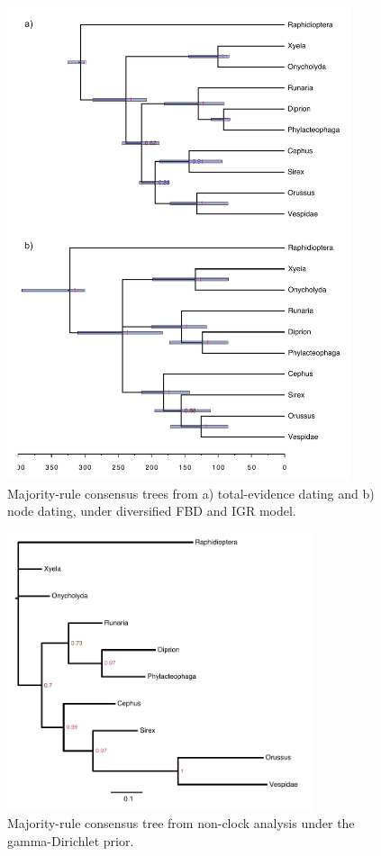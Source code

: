 \documentclass[12pt]{article}
\begin{document}
\begin{figure}[p]
\includegraphics[width=0.9\textwidth]{figures/cltree.pdf}
\caption{Majority-rule consensus trees from a) total-evidence dating and b) node dating, under diversified FBD and IGR model.}
\label{fig_cltree}
\end{figure}

\begin{figure}[p]
\includegraphics[width=0.8\textwidth]{figures/nctree.pdf}
\caption{Majority-rule consensus tree from non-clock analysis under the gamma-Dirichlet prior.}
\label{fig_nctree}
\end{figure}
\end{document}
